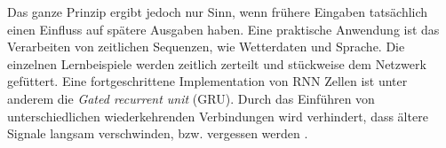 Das ganze Prinzip ergibt jedoch nur Sinn, wenn frühere Eingaben tatsächlich einen Einfluss auf spätere Ausgaben haben. Eine praktische Anwendung ist das Verarbeiten von zeitlichen Sequenzen, wie Wetterdaten und Sprache. Die einzelnen Lernbeispiele werden  zeitlich zerteilt und stückweise dem Netzwerk gefüttert.
Eine fortgeschrittene Implementation von RNN Zellen ist unter anderem die \textit{Gated recurrent unit} (GRU)\parencite{gru}. Durch das Einführen von unterschiedlichen wiederkehrenden Verbindungen wird verhindert, dass ältere Signale langsam verschwinden, bzw. vergessen werden \parencite{chollet}.